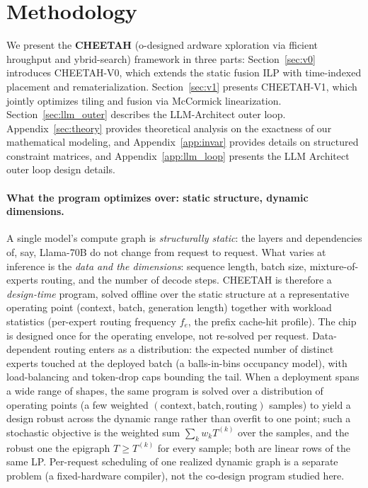 \section{Methodology}
\label{sec:methods}
We present the \textbf{CHEETAH} (o-designed ardware xploration via fficient hroughput and ybrid-search) framework in three parts: Section~\ref{sec:v0} introduces CHEETAH-V0, which extends the static fusion ILP with time-indexed placement and rematerialization. Section~\ref{sec:v1} presents CHEETAH-V1, which jointly optimizes tiling and fusion via McCormick linearization. Section~\ref{sec:llm_outer} describes the LLM-Architect outer loop. Appendix~\ref{sec:theory} provides theoretical analysis on the exactness of our mathematical modeling, and Appendix~\ref{app:invar} provides details on structured constraint matrices, and Appendix~\ref{app:llm_loop} presents the LLM Architect outer loop design details.

\paragraph{What the program optimizes over: static structure, dynamic dimensions.}
A single model's compute graph is \emph{structurally static}: the layers and
dependencies of, say, Llama-70B do not change from request to request. What
varies at inference is the \emph{data and the dimensions}: sequence length, batch
size, mixture-of-experts routing, and the number of decode steps. CHEETAH is
therefore a \emph{design-time} program, solved offline over the static structure
at a representative operating point (context, batch, generation length) together
with workload statistics (per-expert routing frequency $f_e$, the prefix
cache-hit profile). The chip is designed once for the operating envelope, not
re-solved per request. Data-dependent routing enters as a distribution: the
expected number of distinct experts touched at the deployed batch (a
balls-in-bins occupancy model), with load-balancing and token-drop caps bounding
the tail. When a deployment spans a wide range of shapes, the same program is
solved over a distribution of operating points (a few weighted
$(\text{context},\text{batch},\text{routing})$ samples) to yield a design robust
across the dynamic range rather than overfit to one point; such a stochastic
objective is the weighted sum $\sum_k w_k T^{(k)}$ over the samples, and the
robust one the epigraph $T \ge T^{(k)}$ for every sample; both are linear rows
of the same LP. Per-request scheduling of one realized dynamic graph is
a separate problem (a fixed-hardware compiler), not the co-design program studied
here.


